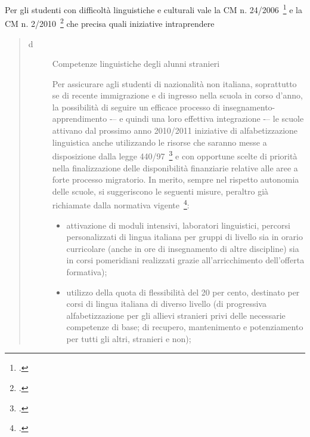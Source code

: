 Per gli studenti con difficoltà linguistiche e culturali vale la CM n. 24/2006~\footcite{lin_1_marzo_2006} e la CM n. 2/2010~\footcite{CM_2_2010} che precisa quali iniziative intraprendere 
\begin{quote}
	\begin{description}
		\item[d] Competenze linguistiche degli alunni stranieri
		
		Per assicurare agli studenti di nazionalità non italiana, soprattutto se di recente immigrazione e di ingresso nella scuola in corso d'anno, la possibilità di seguire un efficace
		processo di insegnamento-apprendimento -– e quindi una loro effettiva integrazione -– le scuole
		attivano dal prossimo anno 2010/2011 iniziative di alfabetizzazione linguistica anche
		utilizzando le risorse che saranno messe a disposizione dalla legge 440/97~\footcite{Legge_440_97} e con opportune
		scelte di priorità nella finalizzazione delle disponibilità finanziarie relative alle aree a forte
		processo migratorio.
		In merito, sempre nel rispetto autonomia delle scuole, si suggeriscono le seguenti
		misure, peraltro già richiamate dalla normativa vigente~\footcite[Art. 45 comma 4 ]{DPR_394_1999}:
		\begin{itemize}
			\item 	attivazione di moduli intensivi, laboratori linguistici, percorsi personalizzati di
			lingua italiana per gruppi di livello sia in orario curricolare (anche in ore di
			insegnamento di altre discipline) sia in corsi pomeridiani realizzati grazie all'arricchimento dell'offerta formativa);
			\item utilizzo della quota di flessibilità del 20 per cento, destinato per corsi di lingua
			italiana di diverso livello (di progressiva alfabetizzazione per gli allievi stranieri privi
			delle necessarie competenze di base; di recupero, mantenimento e potenziamento per tutti gli altri, stranieri e non);

\end{itemize}
\end{description}
\end{quote}
